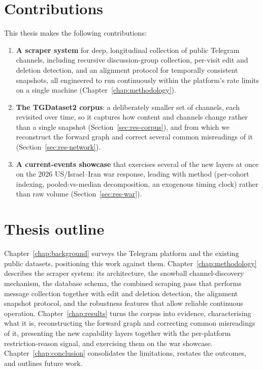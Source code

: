 \section*{Contributions}

This thesis makes the following contributions:

\begin{enumerate}
  \item \textbf{A scraper system} for deep, longitudinal collection of public Telegram channels, including recursive discussion-group collection, per-visit edit and deletion detection, and an alignment protocol for temporally consistent snapshots, all engineered to run continuously within the platform's rate limits on a single machine (Chapter~\ref{chap:methodology}).

  \item \textbf{The TGDataset2 corpus}: a deliberately smaller set of channels, each revisited over time, so it captures how content and channels change rather than a single snapshot (Section~\ref{sec:res-corpus}), and from which we reconstruct the forward graph and correct several common misreadings of it (Section~\ref{sec:res-network}).

  \item \textbf{A current-events showcase} that exercises several of the new layers at once on the 2026 US/Israel--Iran war response, leading with method (per-cohort indexing, pooled-vs-median decomposition, an exogenous timing clock) rather than raw volume (Section~\ref{sec:res-war}).
\end{enumerate}

\section*{Thesis outline}

Chapter~\ref{chap:background} surveys the Telegram platform and the existing public datasets, positioning this work against them. Chapter~\ref{chap:methodology} describes the scraper system: its architecture, the snowball channel-discovery mechanism, the database schema, the combined scraping pass that performs message collection together with edit and deletion detection, the alignment snapshot protocol, and the robustness features that allow reliable continuous operation. Chapter~\ref{chap:results} turns the corpus into evidence, characterising what it is, reconstructing the forward graph and correcting common misreadings of it, presenting the new capability layers together with the per-platform restriction-reason signal, and exercising them on the war showcase. Chapter~\ref{chap:conclusion} consolidates the limitations, restates the outcomes, and outlines future work.

